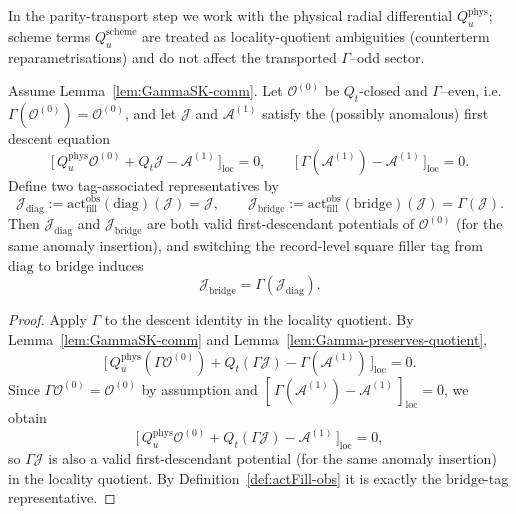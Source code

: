 \begin{remark}
In the parity-transport step we work with the physical radial differential
$Q_u^{\mathrm{phys}}$; scheme terms $Q_u^{\mathrm{scheme}}$ are treated as
locality-quotient ambiguities (counterterm reparametrisations) and do not affect
the transported $\Gamma$--odd sector.
\end{remark}

\begin{lemma}
\label{lem:bridgeActsByGamma}
Assume Lemma~\ref{lem:GammaSK-comm}. Let $\mathcal O^{(0)}$ be $Q_t$-closed and
$\Gamma$--even, i.e.\ $\Gamma(\mathcal O^{(0)})=\mathcal O^{(0)}$, and let
$\mathcal J$ and $\mathcal A^{(1)}$ satisfy the (possibly anomalous) first
descent equation
\[
\big[\,Q_u^{\mathrm{phys}}\mathcal O^{(0)} + Q_t\mathcal J - \mathcal A^{(1)}\,\big]_{\mathrm{loc}}=0,
\qquad
\big[\,\Gamma(\mathcal A^{(1)})-\mathcal A^{(1)}\,\big]_{\mathrm{loc}}=0.
\]
Define two tag-associated representatives by
\[
\mathcal J_{\mathrm{diag}}
:=\mathrm{act}_{\mathrm{fill}}^{\mathrm{obs}}(\mathrm{diag})(\mathcal J)
=\mathcal J,
\qquad
\mathcal J_{\mathrm{bridge}}
:=\mathrm{act}_{\mathrm{fill}}^{\mathrm{obs}}(\mathrm{bridge})(\mathcal J)
=\Gamma(\mathcal J).
\]
Then $\mathcal J_{\mathrm{diag}}$ and $\mathcal J_{\mathrm{bridge}}$
are both valid first-descendant potentials of $\mathcal O^{(0)}$ (for the same
anomaly insertion), and switching the
record-level square filler tag from $\mathrm{diag}$ to $\mathrm{bridge}$ induces
\[
\mathcal J_{\mathrm{bridge}}=\Gamma(\mathcal J_{\mathrm{diag}}).
\]
\end{lemma}

\begin{proof}
Apply $\Gamma$ to the descent identity in the locality quotient. By
Lemma~\ref{lem:GammaSK-comm} and Lemma~\ref{lem:Gamma-preserves-quotient},
\[
\big[\,Q_u^{\mathrm{phys}}(\Gamma\mathcal O^{(0)}) + Q_t(\Gamma\mathcal J) - \Gamma(\mathcal A^{(1)})\,\big]_{\mathrm{loc}}=0.
\]
Since $\Gamma\mathcal O^{(0)}=\mathcal O^{(0)}$ by assumption and
$[\,\Gamma(\mathcal A^{(1)})-\mathcal A^{(1)}\,]_{\mathrm{loc}}=0$, we obtain
\[
\big[\,Q_u^{\mathrm{phys}}\mathcal O^{(0)} + Q_t(\Gamma\mathcal J) - \mathcal A^{(1)}\,\big]_{\mathrm{loc}}=0,
\]
so $\Gamma\mathcal J$ is also a valid first-descendant potential (for the same
anomaly insertion) in the locality quotient. By Definition~\ref{def:actFill-obs}
it is exactly the $\mathrm{bridge}$-tag representative.
\end{proof}

